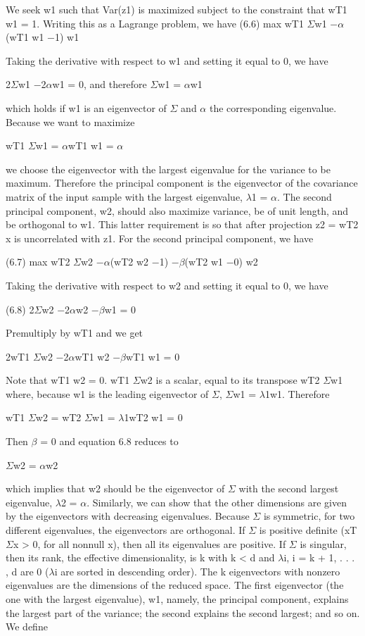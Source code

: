 We seek w1 such that Var(z1) is maximized subject to the constraint that wT1 w1 = 1. Writing this as a Lagrange problem, we have (6.6) max wT1 $\Sigma$w1 $-$$\alpha$(wT1 w1 $-$1) w1

Taking the derivative with respect to w1 and setting it equal to 0, we have

2$\Sigma$w1 $-$2$\alpha$w1 = 0, and therefore $\Sigma$w1 = $\alpha$w1

which holds if w1 is an eigenvector of $\Sigma$ and $\alpha$ the corresponding eigenvalue. Because we want to maximize

wT1 $\Sigma$w1 = $\alpha$wT1 w1 = $\alpha$

we choose the eigenvector with the largest eigenvalue for the variance to be maximum. Therefore the principal component is the eigenvector of the covariance matrix of the input sample with the largest eigenvalue, $\lambda$1 = $\alpha$. The second principal component, w2, should also maximize variance, be of unit length, and be orthogonal to w1. This latter requirement is so that after projection z2 = wT2 x is uncorrelated with z1. For the second principal component, we have

(6.7) max wT2 $\Sigma$w2 $-$$\alpha$(wT2 w2 $-$1) $-$$\beta$(wT2 w1 $-$0) w2

Taking the derivative with respect to w2 and setting it equal to 0, we have

(6.8) 2$\Sigma$w2 $-$2$\alpha$w2 $-$$\beta$w1 = 0

Premultiply by wT1 and we get

2wT1 $\Sigma$w2 $-$2$\alpha$wT1 w2 $-$$\beta$wT1 w1 = 0

Note that wT1 w2 = 0. wT1 $\Sigma$w2 is a scalar, equal to its transpose wT2 $\Sigma$w1 where, because w1 is the leading eigenvector of $\Sigma$, $\Sigma$w1 = $\lambda$1w1. Therefore

wT1 $\Sigma$w2 = wT2 $\Sigma$w1 = $\lambda$1wT2 w1 = 0

Then $\beta$ = 0 and equation 6.8 reduces to

$\Sigma$w2 = $\alpha$w2

which implies that w2 should be the eigenvector of $\Sigma$ with the second largest eigenvalue, $\lambda$2 = $\alpha$. Similarly, we can show that the other dimensions are given by the eigenvectors with decreasing eigenvalues. Because $\Sigma$ is symmetric, for two different eigenvalues, the eigenvectors are orthogonal. If $\Sigma$ is positive definite (xT $\Sigma$x > 0, for all nonnull x), then all its eigenvalues are positive. If $\Sigma$ is singular, then its rank, the effective dimensionality, is k with k < d and $\lambda$i, i = k + 1, . . . , d are 0 ($\lambda$i are sorted in descending order). The k eigenvectors with nonzero eigenvalues are the dimensions of the reduced space. The first eigenvector (the one with the largest eigenvalue), w1, namely, the principal component, explains the largest part of the variance; the second explains the second largest; and so on. We define


